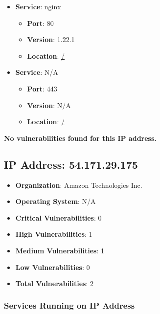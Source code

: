 \documentclass{article}
\begin{document}
\begin{itemize}
    
        \item \textbf{Service}: nginx
        \begin{itemize}
            \item \textbf{Port}: 80
            \item \textbf{Version}:  1.22.1 
            \item \textbf{Location}: \href{ / }{ / }
        \end{itemize}
    
        \item \textbf{Service}: N/A
        \begin{itemize}
            \item \textbf{Port}: 443
            \item \textbf{Version}:  N/A 
            \item \textbf{Location}: \href{ / }{ / }
        \end{itemize}
    
\end{itemize}


\textbf{No vulnerabilities found for this IP address.}




\clearpage



\subsection{IP Address: 54.171.29.175}

\begin{itemize}
    \item \textbf{Organization}: Amazon Technologies Inc.
    \item \textbf{Operating System}:  N/A 
    \item \textbf{Critical Vulnerabilities}: 0
    \item \textbf{High Vulnerabilities}: 1
    \item \textbf{Medium Vulnerabilities}: 1
    \item \textbf{Low Vulnerabilities}: 0
    \item \textbf{Total Vulnerabilities}: 2
\end{itemize}

\subsubsection*{Services Running on IP Address}
\end{document}
